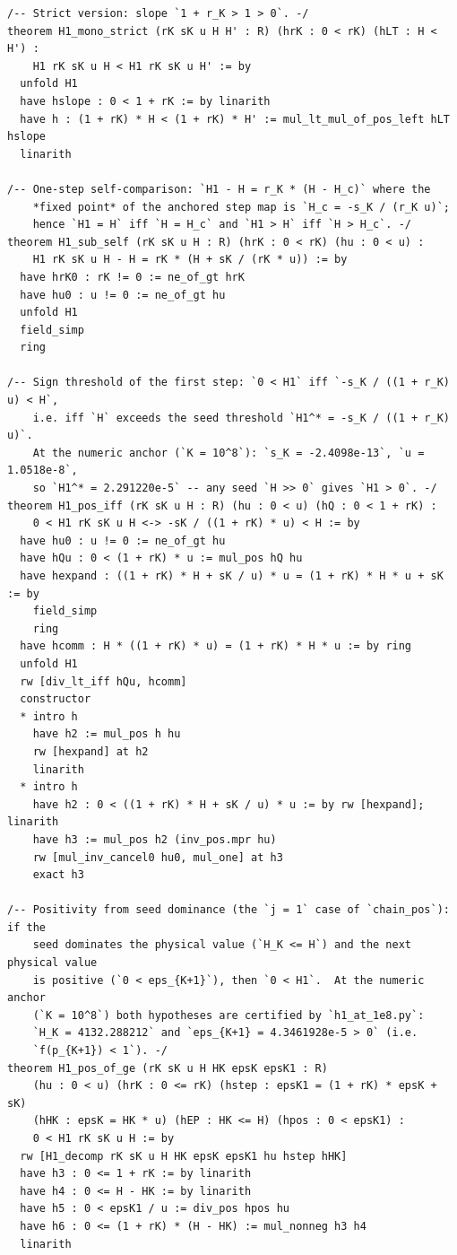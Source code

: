 \documentclass[11pt]{article}
\theoremstyle{remark}
\begin{document}
\begin{verbatim}
/-- Strict version: slope `1 + r_K > 1 > 0`. -/
theorem H1_mono_strict (rK sK u H H' : R) (hrK : 0 < rK) (hLT : H < H') :
    H1 rK sK u H < H1 rK sK u H' := by
  unfold H1
  have hslope : 0 < 1 + rK := by linarith
  have h : (1 + rK) * H < (1 + rK) * H' := mul_lt_mul_of_pos_left hLT hslope
  linarith

/-- One-step self-comparison: `H1 - H = r_K * (H - H_c)` where the
    *fixed point* of the anchored step map is `H_c = -s_K / (r_K u)`;
    hence `H1 = H` iff `H = H_c` and `H1 > H` iff `H > H_c`. -/
theorem H1_sub_self (rK sK u H : R) (hrK : 0 < rK) (hu : 0 < u) :
    H1 rK sK u H - H = rK * (H + sK / (rK * u)) := by
  have hrK0 : rK != 0 := ne_of_gt hrK
  have hu0 : u != 0 := ne_of_gt hu
  unfold H1
  field_simp
  ring

/-- Sign threshold of the first step: `0 < H1` iff `-s_K / ((1 + r_K) u) < H`,
    i.e. iff `H` exceeds the seed threshold `H1^* = -s_K / ((1 + r_K) u)`.
    At the numeric anchor (`K = 10^8`): `s_K = -2.4098e-13`, `u = 1.0518e-8`,
    so `H1^* = 2.291220e-5` -- any seed `H >> 0` gives `H1 > 0`. -/
theorem H1_pos_iff (rK sK u H : R) (hu : 0 < u) (hQ : 0 < 1 + rK) :
    0 < H1 rK sK u H <-> -sK / ((1 + rK) * u) < H := by
  have hu0 : u != 0 := ne_of_gt hu
  have hQu : 0 < (1 + rK) * u := mul_pos hQ hu
  have hexpand : ((1 + rK) * H + sK / u) * u = (1 + rK) * H * u + sK := by
    field_simp
    ring
  have hcomm : H * ((1 + rK) * u) = (1 + rK) * H * u := by ring
  unfold H1
  rw [div_lt_iff hQu, hcomm]
  constructor
  * intro h
    have h2 := mul_pos h hu
    rw [hexpand] at h2
    linarith
  * intro h
    have h2 : 0 < ((1 + rK) * H + sK / u) * u := by rw [hexpand]; linarith
    have h3 := mul_pos h2 (inv_pos.mpr hu)
    rw [mul_inv_cancel0 hu0, mul_one] at h3
    exact h3

/-- Positivity from seed dominance (the `j = 1` case of `chain_pos`): if the
    seed dominates the physical value (`H_K <= H`) and the next physical value
    is positive (`0 < eps_{K+1}`), then `0 < H1`.  At the numeric anchor
    (`K = 10^8`) both hypotheses are certified by `h1_at_1e8.py`:
    `H_K = 4132.288212` and `eps_{K+1} = 4.3461928e-5 > 0` (i.e.
    `f(p_{K+1}) < 1`). -/
theorem H1_pos_of_ge (rK sK u H HK epsK epsK1 : R)
    (hu : 0 < u) (hrK : 0 <= rK) (hstep : epsK1 = (1 + rK) * epsK + sK)
    (hHK : epsK = HK * u) (hEP : HK <= H) (hpos : 0 < epsK1) :
    0 < H1 rK sK u H := by
  rw [H1_decomp rK sK u H HK epsK epsK1 hu hstep hHK]
  have h3 : 0 <= 1 + rK := by linarith
  have h4 : 0 <= H - HK := by linarith
  have h5 : 0 < epsK1 / u := div_pos hpos hu
  have h6 : 0 <= (1 + rK) * (H - HK) := mul_nonneg h3 h4
  linarith


\end{verbatim}
\end{document}
